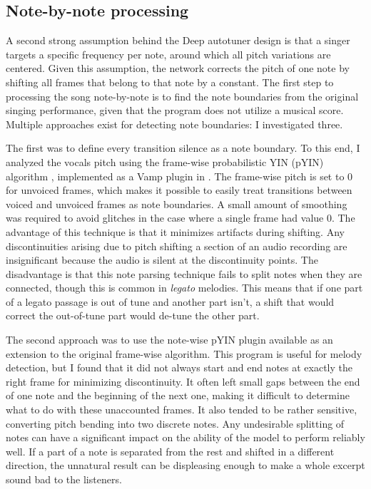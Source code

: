 \subsection{Note-by-note processing}
\label{ref:notes}
A second strong assumption behind the Deep autotuner design is that a singer targets a specific frequency per note, around which all pitch variations are centered. Given this assumption, the network corrects the pitch of one note by shifting all frames that belong to that note by a constant. The first step to processing the song note-by-note is to find the note boundaries from the original singing performance, given that the program does not utilize a musical score. Multiple approaches exist for detecting note boundaries: I investigated three. 

The first was to define every transition silence as a note boundary. To this end, I analyzed the vocals pitch using the frame-wise probabilistic YIN (pYIN) algorithm \cite{mauch2014pyin}, implemented as a Vamp plugin in \cite{cannam2010sonic}. The frame-wise pitch is set to 0 for unvoiced frames, which makes it possible to easily treat transitions between voiced and unvoiced frames as note boundaries. A small amount of smoothing was required to avoid glitches in the case where a single frame had value 0. The advantage of this technique is that it minimizes artifacts during shifting. Any discontinuities arising due to pitch shifting a section of an audio recording are insignificant because the audio is silent at the discontinuity points. The disadvantage is that this note parsing technique fails to split notes when they are connected, though this is common in \textit{legato} melodies. This means that if one part of a legato passage is out of tune and another part isn't, a shift that would correct the out-of-tune part would de-tune the other part.

The second approach was to use the note-wise pYIN plugin available as an extension to the original frame-wise algorithm. This program is useful for melody detection, but I found that it did not always start and end notes at exactly the right frame for minimizing discontinuity. It often left small gaps between the end of one note and the beginning of the next one, making it difficult to determine what to do with these unaccounted frames. It also tended to be rather sensitive, converting pitch bending into two discrete notes. Any undesirable splitting of notes can have a significant impact on the ability of the model to perform reliably well. If a part of a note is separated from the rest and shifted in a different direction, the unnatural result can be displeasing enough to make a whole excerpt sound bad to the listeners.

